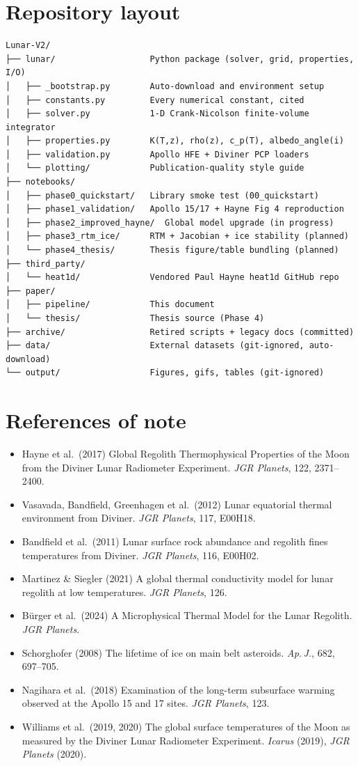 \documentclass[11pt,a4paper]{book}
\begin{document}
\appendix
\chapter{Repository layout}
\begin{verbatim}
Lunar-V2/
├── lunar/                   Python package (solver, grid, properties, I/O)
│   ├── _bootstrap.py        Auto-download and environment setup
│   ├── constants.py         Every numerical constant, cited
│   ├── solver.py            1-D Crank-Nicolson finite-volume integrator
│   ├── properties.py        K(T,z), rho(z), c_p(T), albedo_angle(i)
│   ├── validation.py        Apollo HFE + Diviner PCP loaders
│   └── plotting/            Publication-quality style guide
├── notebooks/
│   ├── phase0_quickstart/   Library smoke test (00_quickstart)
│   ├── phase1_validation/   Apollo 15/17 + Hayne Fig 4 reproduction
│   ├── phase2_improved_hayne/  Global model upgrade (in progress)
│   ├── phase3_rtm_ice/      RTM + Jacobian + ice stability (planned)
│   └── phase4_thesis/       Thesis figure/table bundling (planned)
├── third_party/
│   └── heat1d/              Vendored Paul Hayne heat1d GitHub repo
├── paper/
│   ├── pipeline/            This document
│   └── thesis/              Thesis source (Phase 4)
├── archive/                 Retired scripts + legacy docs (committed)
├── data/                    External datasets (git-ignored, auto-download)
└── output/                  Figures, gifs, tables (git-ignored)
\end{verbatim}

\chapter{References of note}
\begin{itemize}
\item Hayne et al.\ (2017) Global Regolith Thermophysical Properties of the Moon from the Diviner Lunar Radiometer Experiment. \emph{JGR Planets}, 122, 2371--2400.
\item Vasavada, Bandfield, Greenhagen et al.\ (2012) Lunar equatorial thermal environment from Diviner. \emph{JGR Planets}, 117, E00H18.
\item Bandfield et al.\ (2011) Lunar surface rock abundance and regolith fines temperatures from Diviner. \emph{JGR Planets}, 116, E00H02.
\item Martinez \& Siegler (2021) A global thermal conductivity model for lunar regolith at low temperatures. \emph{JGR Planets}, 126.
\item B\"urger et al.\ (2024) A Microphysical Thermal Model for the Lunar Regolith. \emph{JGR Planets}.
\item Schorghofer (2008) The lifetime of ice on main belt asteroids. \emph{Ap.\,J.}, 682, 697--705.
\item Nagihara et al.\ (2018) Examination of the long-term subsurface warming observed at the Apollo 15 and 17 sites. \emph{JGR Planets}, 123.
\item Williams et al.\ (2019, 2020) The global surface temperatures of the Moon as measured by the Diviner Lunar Radiometer Experiment. \emph{Icarus} (2019), \emph{JGR Planets} (2020).
\end{itemize}
\end{document}
